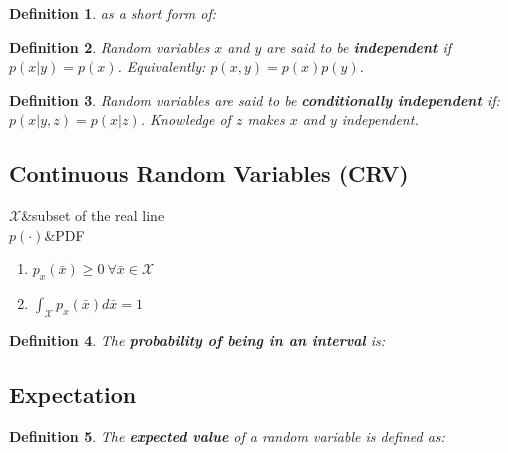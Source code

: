 \documentclass[10pt,a4paper]{scrartcl}
\newtheorem{define}{Definition}
\begin{document}
\begin{multicols*}{2}
{\begin{define}

as a short form of:

\end{define}

\begin{define}
Random variables $x$ and $y$ are said to be \textbf{independent} if $p(x|y)=p(x)$. Equivalently: $p(x,y)=p(x)p(y)$.
\end{define}

\begin{define}
Random variables are said to be \textbf{conditionally independent} if: $p(x|y,z)=p(x|z)$. Knowledge of $z$ makes $x$ and $y$ independent.
\end{define}

\subsection{Continuous Random Variables (CRV)}

\begin{TDefinitionTable*}
$\mathcal{X}$&subset of the real line\\
$p(\cdot)$&PDF
\end{TDefinitionTable*}

\begin{enumerate}
\item $p_x(\bar{x})\geq 0\ \forall\bar{x}\in\mathcal{X}$
\item $\int_{\mathcal{X}}p_x(\bar{x})d\bar{x}=1$
\end{enumerate}

\begin{define}
The \textbf{probability of being in an interval} is:

\end{define}

\subsection{Expectation}

\begin{define}
The \textbf{expected value} of a random variable is defined as:

\end{define}

}
\end{multicols*}
\end{document}

